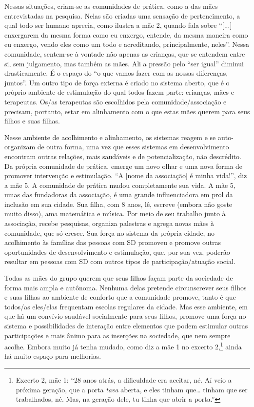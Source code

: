 \documentclass[output=paper,colorlinks,citecolor=brown,booklanguage=portuguese]{langscibook}
\begin{document}
Nessas situações, criam-se as comunidades de prática, como a das mães entrevistadas na pesquisa. Nelas são criadas uma sensação de pertencimento, a qual todo ser humano aprecia, como ilustra a mãe 2, quando fala sobre “[...] enxergarem da mesma forma como eu enxergo, entende, da mesma maneira como eu enxergo, vendo eles como um todo e acreditando, principalmente, neles”. Nessa comunidade, sentem-se à vontade não apenas as crianças, que se entendem entre si, sem julgamento, mas também as mães. Ali a pressão pelo “ser igual” diminui drasticamente. É o espaço do “o que vamos fazer com as nossas diferenças, juntos”. Um outro tipo de força externa é criado no sistema aberto, que é o próprio ambiente de estimulação do qual todos fazem parte: crianças, mães e terapeutas. Os/as terapeutas são escolhidos pela comunidade/associação e precisam, portanto, estar em alinhamento com o que estas mães querem para seus filhos e suas filhas.

Nesse ambiente de acolhimento e alinhamento, os sistemas reagem e se auto-organizam de outra forma, uma vez que esses sistemas em desenvolvimento encontram outras relações, mais saudáveis e de potencialização, não descrédito. Da própria comunidade de prática, emerge um novo olhar e uma nova forma de promover intervenção e estimulação. “A [nome da associação] é minha vida!”, diz a mãe 5. A comunidade de prática mudou completamente sua vida. A mãe 5, umas das fundadoras da associação, é uma grande influenciadora em prol da inclusão em sua cidade. Sua filha, com 8 anos, lê, escreve (embora não goste muito disso), ama matemática e música. Por meio de seu trabalho junto à associação, recebe pesquisas, organiza palestras e agrega novas mães à comunidade, que só cresce. Sua força no sistema da própria cidade, no acolhimento às famílias das pessoas com SD promoveu e promove outras oportunidades de desenvolvimento e estimulação, que, por sua vez, poderão resultar em pessoas com SD com outros tipos de participação/atuação social.

Todas as mães do grupo querem que seus filhos façam parte da sociedade de forma mais ampla e autônoma. Nenhuma delas pretende circunscrever seus filhos e suas filhas ao ambiente de conforto que a comunidade promove, tanto é que todos/as eles/elas frequentam escolas regulares da cidade. Mas esse ambiente, em que há um convívio saudável socialmente para seus filhos, promove uma força no sistema e possibilidades de interação entre elementos que podem estimular outras participações e mais ânimo para as inserções na sociedade, que nem sempre acolhe. Embora muito já tenha mudado, como diz a mãe 1 no excerto 2,\footnote{Excerto 2, mãe 1: “28 anos atrás, a dificuldade era aceitar, né. Aí veio a próxima geração, que a porta \emph{tava} aberta, e eles tinham que… tinham que ser trabalhados, né. Mas, na geração dele, tu tinha que abrir a porta.”} ainda há muito espaço para melhorias.
\end{document}
